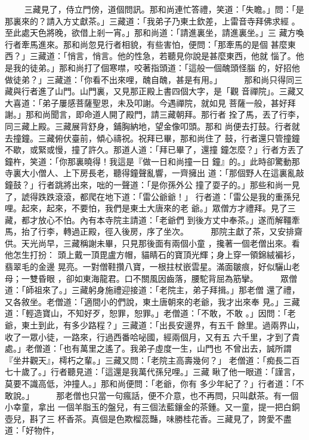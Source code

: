 \begin{pinyinscope}
{　　
三藏見了，侍立門傍，道個問訊。那和尚連忙答禮，笑道：「失瞻。」問：「是
那裏來的？請入方丈獻茶。」三藏道：「我弟子乃東土欽差，上雷音寺拜佛求經
。至此處天色將晚，欲借上剎一宵。」那和尚道：「請進裏坐，請進裏坐。」三
藏方喚行者牽馬進來。那和尚忽見行者相貌，有些害怕，便問：「那牽馬的是個
甚麼東西？」三藏道：「悄言，悄言。他的性急，若聽見你說是甚麼東西，他就
惱了。他是我的徒弟。」那和尚打了個寒噤，咬著指頭道：「這般一個醜頭怪腦
的，好招他做徒弟？」三藏道：「你看不出來哩，醜自醜，甚是有用。」
　　
那和尚只得同三藏與行者進了山門。山門裏，又見那正殿上書四個大字，是「觀
音禪院」。三藏又大喜道：「弟子屢感菩薩聖恩，未及叩謝。今遇禪院，就如見
菩薩一般，甚好拜謝。」那和尚聞言，即命道人開了殿門，請三藏朝拜。那行者
拴了馬，丟了行李，同三藏上殿。三藏展背舒身，鋪胸納地，望金像叩頭。那和
尚便去打鼓。行者就去撞鐘。三藏俯伏臺前，傾心禱祝。祝拜已畢，那和尚住了
鼓，行者還只管撞鐘不歇，或緊或慢，撞了許久。那道人道：「拜已畢了，還撞
鐘怎麼？」行者方丟了鐘杵，笑道：「你那裏曉得！我這是『做一日和尚撞一日
鐘』的。」此時卻驚動那寺裏大小僧人、上下房長老，聽得鐘聲亂響，一齊擁出
道：「那個野人在這裏亂敲鐘鼓？」行者跳將出來，咄的一聲道：「是你孫外公
撞了耍子的。」那些和尚一見了，諕得跌跌滾滾，都爬在地下道：「雷公爺爺！」
行者道：「雷公是我的重孫兒哩。起來，起來，不要怕，我們是東土大唐來的老
爺。」眾僧方才禮拜。見了三藏，都才放心不怕。內有本寺院主請道：「老爺們
到後方丈中奉茶。」遂而解韁牽馬，抬了行李，轉過正殿，徑入後房，序了坐次。
　　
那院主獻了茶，又安排齋供。天光尚早，三藏稱謝未畢，只見那後面有兩個小童
，攙著一個老僧出來。看他怎生打扮：
頭上戴一頂毘盧方帽，貓睛石的寶頂光輝；身上穿一領錦絨褊衫，翡翠毛的金邊
晃亮。一對僧鞋攢八寶，一根拄杖嵌雲星。滿面皺痕，好似驪山老母；一雙昏眼
，卻如東海龍君。口不關風因齒落，腰駝背屈為筋攣。
　　
眾僧道：「師祖來了。」三藏躬身施禮迎接道：「老院主，弟子拜揖。」那老僧
還了禮，又各敘坐。老僧道：「適間小的們說，東土唐朝來的老爺，我才出來奉
見。」三藏道：「輕造寶山，不知好歹，恕罪，恕罪。」老僧道：「不敢，不敢
。」因問：「老爺，東土到此，有多少路程？」三藏道：「出長安邊界，有五千
餘里。過兩界山，收了一眾小徒，一路來，行過西番哈咇國，經兩個月，又有五
六千里，才到了貴處。」老僧道：「也有萬里之遙了。我弟子虛度一生，山門也
不曾出去，誠所謂『坐井觀天』，樗朽之輩。」三藏又問：「老院主高壽幾何？」
老僧道：「痴長二百七十歲了。」行者聽見道：「這還是我萬代孫兒哩。」三藏
瞅了他一眼道：「謹言，莫要不識高低，沖撞人。」那和尚便問：「老爺，你有
多少年紀了？」行者道：「不敢說。」
　　
那老僧也只當一句瘋話，便不介意，也不再問，只叫獻茶。有一個小幸童，拿出
一個羊脂玉的盤兒，有三個法藍鑲金的茶鍾。又一童，提一把白銅壺兒，斟了三
杯香茶。真個是色欺榴蕊豔，味勝桂花香。三藏見了，誇愛不盡道：「好物件，
}
\end{pinyinscope}
